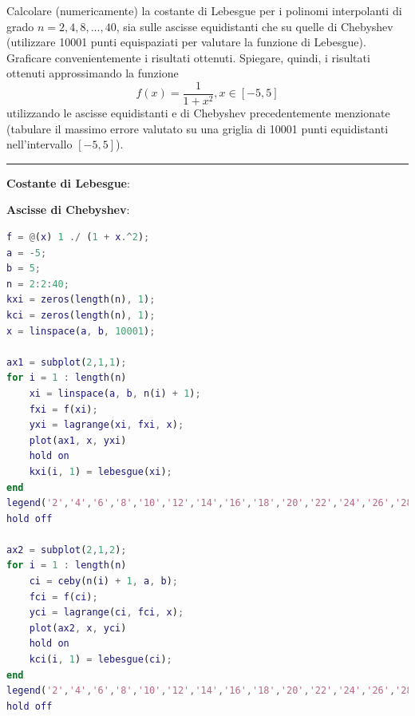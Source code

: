 Calcolare (numericamente) la costante di Lebesgue per i polinomi interpolanti di grado $n = 2, 4, 8, ... , 40$, sia sulle ascisse equidistanti che su quelle di Chebyshev (utilizzare 10001 punti equispaziati per valutare la funzione di Lebesgue). Graficare convenientemente i risultati ottenuti. Spiegare, quindi, i risultati ottenuti approssimando la funzione
$$f(x)=\frac{1}{1+x^{2}},x\in[ - 5,5]$$
utilizzando le ascisse equidistanti e di Chebyshev precedentemente menzionate (tabulare il massimo errore valutato su una griglia di 10001 punti equidistanti nell’intervallo $[ - 5,5]$).

\hspace*{\fill}
\par\noindent\rule{\textwidth}{0.4pt}
\hspace*{\fill}

\textbf{Costante di Lebesgue}:

\textbf{Ascisse di Chebyshev}:


\begin{lstlisting}[language=Matlab, caption=Codice Matlab]
f = @(x) 1 ./ (1 + x.^2);
a = -5;
b = 5;
n = 2:2:40;
kxi = zeros(length(n), 1);
kci = zeros(length(n), 1);
x = linspace(a, b, 10001);

ax1 = subplot(2,1,1);
for i = 1 : length(n)
	xi = linspace(a, b, n(i) + 1);
	fxi = f(xi);
	yxi = lagrange(xi, fxi, x);
	plot(ax1, x, yxi)
	hold on
	kxi(i, 1) = lebesgue(xi);
end
legend('2','4','6','8','10','12','14','16','18','20','22','24','26','28','30','32','34','36','38','40')
hold off

ax2 = subplot(2,1,2);
for i = 1 : length(n)
	ci = ceby(n(i) + 1, a, b);
	fci = f(ci);
	yci = lagrange(ci, fci, x);
	plot(ax2, x, yci)
	hold on
	kci(i, 1) = lebesgue(ci);
end
legend('2','4','6','8','10','12','14','16','18','20','22','24','26','28','30','32','34','36','38','40')
hold off
\end{lstlisting}

